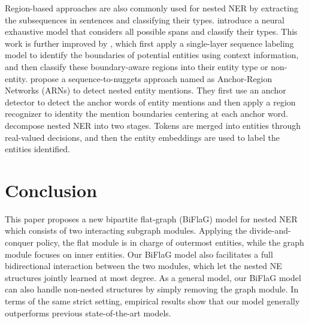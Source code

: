 \documentclass[11pt,a4paper]{article}
\begin{document}
Region-based approaches are also commonly used for nested NER by extracting the subsequences in sentences and classifying their types.
\cite{sohrab2018deep} introduce a neural exhaustive model
that considers all possible spans and classify their types. This work is further improved by \cite{zheng2019boundary}, which first apply a single-layer sequence labeling model to identify the boundaries of potential entities using context information, and then classify these boundary-aware regions into their entity type or non-entity.
\cite{lin2019sequence} propose a sequence-to-nuggets
approach named as Anchor-Region Networks (ARNs) to detect nested entity mentions. They first use an anchor detector to detect the anchor words of entity mentions and then apply a region recognizer to identity the mention boundaries centering at each anchor word.
\cite{fisher2019merge} decompose nested NER into two
stages. Tokens are merged into entities through real-valued decisions, and then the entity embeddings are used to label the entities identified. 


\section{Conclusion}
This paper proposes a new bipartite flat-graph (BiFlaG) model for nested NER which consists of two interacting subgraph modules. Applying the divide-and-conquer policy, the flat module is in charge of outermost entities, while the graph module focuses on inner entities. Our BiFlaG model also facilitates a full bidirectional interaction between the two modules, which let the nested NE structures jointly learned at most degree. As a general model, our BiFlaG model can also handle non-nested structures by simply removing the graph module. In terms of the same strict setting, empirical results show that our model generally outperforms previous state-of-the-art models.




\end{document}
